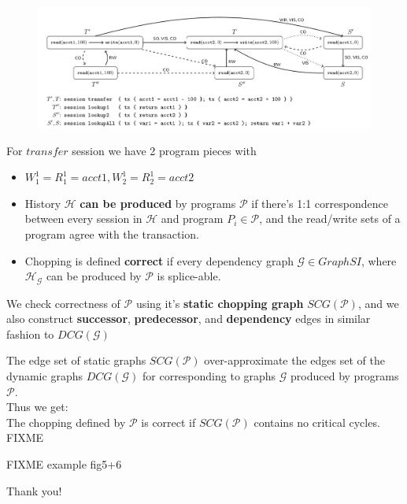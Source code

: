 \documentclass{beamer}
\begin{document}
\begin{frame}
\begin{figure}
	\includegraphics[scale=0.28]{fig4}
\end{figure}
For $transfer$ session we have 2 program pieces with
\begin{itemize}
	\item $W^1_1 = R^1_1 = {acct1}, W^1_2 = R^1_2 = {acct2}$
\end{itemize}
\end{frame}

\begin{frame}
	\begin{itemize}
		\item History $\mathcal{H}$ \textbf{can be produced} by programs $\mathcal{P}$ if there's 1:1 correspondence between every session in $\mathcal{H}$ and program $P_i\in\mathcal{P}$, and the read/write sets of a program agree with the transaction.
		\item Chopping is defined \textbf{correct} if every dependency graph $\mathcal{G}\in GraphSI$, where $\mathcal{H}_\mathcal{G}$ can be produced by $\mathcal{P}$ is splice-able.
	\end{itemize}
\end{frame}

\begin{frame}
	We check correctness of $\mathcal{P}$ using it's \textbf{static chopping graph} $SCG(\mathcal{P})$, and we also construct \textbf{successor}, \textbf{predecessor}, and \textbf{dependency} edges in similar fashion to $DCG(\mathcal{G})$
\end{frame}

\begin{frame}
	The edge set of static graphs $SCG(\mathcal{P})$ over-approximate the edges set of the dynamic graphs $DCG(\mathcal{G})$ for corresponding to graphs $\mathcal{G}$ produced by programs $\mathcal{P}$. \\
	Thus we get: \\
	The chopping defined by $\mathcal{P}$ is correct if $SCG(\mathcal{P})$ contains no critical cycles.
	\\ FIXME
\end{frame}

\begin{frame}
	FIXME example fig5+6
\end{frame}


\begin{frame}
\begin{center}
	Thank you!
\end{center}
\end{frame}
\end{document}
